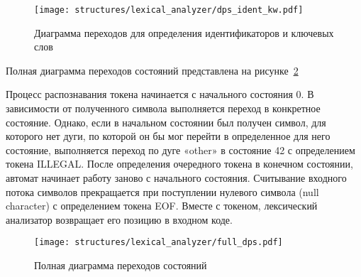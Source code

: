 \begin{figure}[ht]
	\centering
	\vspace{\toppaddingoffigure}
	\texttt{[image: structures/lexical\_analyzer/dps\_ident\_kw.pdf]}
	\caption{Диаграмма переходов для определения идентификаторов и ключевых слов}
	\label{f:dps_ident_kw}
\end{figure}

Полная диаграмма переходов состояний представлена на рисунке~\ref{f:full_dps}

Процесс распознавания токена начинается с начального состояния 0.
В зависимости от полученного символа выполняется переход в конкретное состояние.
Однако, если в начальном состоянии был получен символ, для которого нет дуги,
по которой он бы мог перейти в определенное для него состояние, выполняется переход по дуге «other» в состояние 42 с определением токена ILLEGAL.
После определения очередного токена в конечном состоянии, автомат начинает работу заново с начального состояния.
Считывание входного потока символов прекращается при поступлении нулевого символа (null character) с определением токена EOF.
Вместе с токеном, лексический анализатор возвращает его позицию в входном коде.


\clearpage

\begin{figure}[h!]
	\centering
	\vspace{\toppaddingoffigure}
	\texttt{[image: structures/lexical\_analyzer/full\_dps.pdf]}
	\caption{Полная диаграмма переходов состояний}
	\label{f:full_dps}
\end{figure}

\clearpage